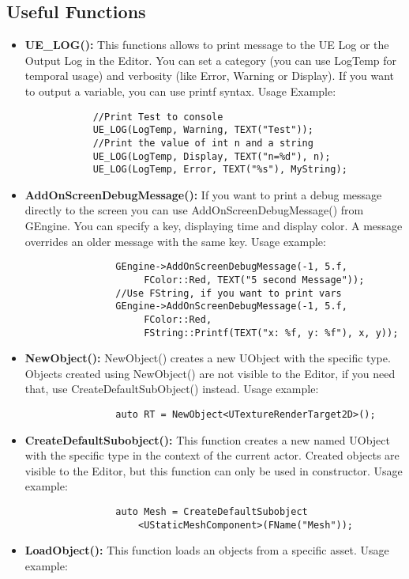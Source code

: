 \documentclass[10pt,a4paper]{article}
\begin{document}
\begin{multicols*}{2}
	\subsection{Useful Functions}
	\begin{itemize}
			\item \textbf{UE\_LOG():} This functions allows to print message to the UE Log or the Output Log in the Editor. You can set a category (you can use LogTemp for temporal usage) and verbosity (like Error, Warning or Display). If you want to output a variable, you can use printf syntax.  Usage Example:
			\begin{verbatim}
			//Print Test to console
			UE_LOG(LogTemp, Warning, TEXT("Test"));
			//Print the value of int n and a string
			UE_LOG(LogTemp, Display, TEXT("n=%d"), n);
			UE_LOG(LogTemp, Error, TEXT("%s"), MyString);
			\end{verbatim}
			\item \textbf{AddOnScreenDebugMessage():} If you want to print a debug message directly to the screen you can use AddOnScreenDebugMessage() from GEngine. You can specify a key, displaying time and display color. A message overrides an older message with the same key. Usage example:
			\begin{verbatim}
				GEngine->AddOnScreenDebugMessage(-1, 5.f, 
				     FColor::Red, TEXT("5 second Message"));
				//Use FString, if you want to print vars
				GEngine->AddOnScreenDebugMessage(-1, 5.f, 
				     FColor::Red, 
				     FString::Printf(TEXT("x: %f, y: %f"), x, y));
			\end{verbatim}
			\item \textbf{NewObject():} NewObject() creates a new UObject with the specific type. Objects created using NewObject() are not visible to the Editor, if you need that, use CreateDefaultSubObject() instead. Usage example:
			\begin{verbatim}
				auto RT = NewObject<UTextureRenderTarget2D>();
			\end{verbatim}
			\item \textbf{CreateDefaultSubobject():} This function creates a new named UObject with the specific type in the context of the current actor. Created objects are visible to the Editor, but this function can only be used in constructor. Usage example:
			\begin{verbatim}
				auto Mesh = CreateDefaultSubobject
				    <UStaticMeshComponent>(FName("Mesh"));
			\end{verbatim}
			\item \textbf{LoadObject():} This function loads an objects from a specific asset. Usage example:

\end{itemize}
\end{multicols*}
\end{document}
